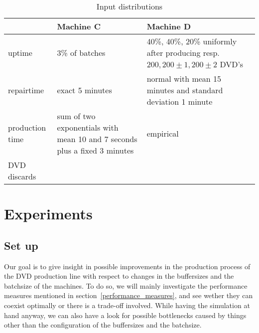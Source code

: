 \documentclass{article}
\begin{document}
\begin{table}[h]
    \begin{tabular}{|p{4cm}|p{4cm}|p{5cm}|}
    \hline
                & Machine C                     & Machine D \\ \hline
uptime          & 3\% of batches                & \parbox{5cm}{40\%, 40\%, 20\% uniformly after producing resp. $200, 200 \pm 1, 200 \pm 2$ DVD's} \\ \hline
repairtime      & exact 5 minutes                   & normal with mean 15 minutes and standard deviation 1 minute \\ \hline
production time & sum of two exponentials with mean 10 and 7 seconds plus a fixed 3 minutes   & empirical \\ \hline
DVD discards    &                               & \\ \hline
    \end{tabular}
    \caption {Input distributions}
    \label{table:input_table}
\end{table}







\section{Experiments}
%
\subsection{Set up}
Our goal is to give insight in possible improvements in the production process of the DVD production line with respect to changes in the buffersizes and the batchsize of the machines.
To do so, we will mainly investigate the performance measures mentioned in section~\ref{performance_measures}, and see wether they can coexist optimally or there is a trade-off involved.
While having the simulation at hand anyway, we can also have a look for possible bottlenecks caused by things other than the configuration of the buffersizes and the batchsize.
\end{document}
